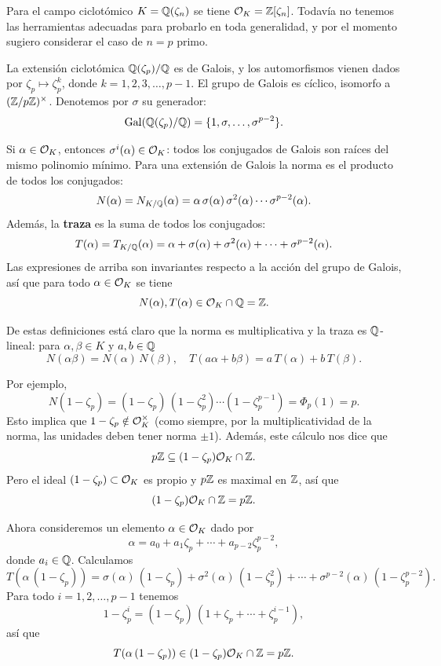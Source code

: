 \begin{ejemplo}
\label{ejemplo:O_K-para-Q(zeta_p)}
  Para el campo ciclotómico $K = \mathbb{Q} (\zeta_n)$ se tiene $\mathcal{O}_K = \mathbb{Z} [\zeta_n]$.
  Todavía no tenemos las herramientas adecuadas para probarlo en toda
  generalidad, y por el momento sugiero considerar el caso de $n = p$ primo.

  La extensión ciclotómica $\mathbb{Q} (\zeta_p)/\mathbb{Q}$ es de Galois, y los automorfismos
  vienen dados por $\zeta_p \mapsto \zeta_p^k$, donde $k = 1,2,3,\ldots,p-1$.
  El grupo de Galois es cíclico, isomorfo a $(\mathbb{Z}/p\mathbb{Z})^\times$. Denotemos por
  $\sigma$ su generador:
  $$\operatorname{Gal} (\mathbb{Q} (\zeta_p)/\mathbb{Q}) = \{ 1, \sigma, \ldots, \sigma^{p-2} \}.$$

  Si $\alpha \in \mathcal{O}_K$, entonces $\sigma^i (\alpha) \in \mathcal{O}_K$: todos los
  conjugados de Galois son raíces del mismo polinomio mínimo. Para una extensión
  de Galois la norma es el producto de todos los conjugados:
  \[ N (\alpha) = N_{K/\mathbb{Q}} (\alpha) =
     \alpha\,\sigma (\alpha)\,\sigma^2(\alpha)\cdots\sigma^{p-2}(\alpha). \]
  Además, la \textbf{traza} es la suma de todos los conjugados:
  \[ T (\alpha) = T_{K/\mathbb{Q}} (\alpha) =
     \alpha + \sigma (\alpha) + \sigma^2 (\alpha) + \cdots + \sigma^{p-2} (\alpha). \]
  Las expresiones de arriba son invariantes respecto a la acción del grupo de
  Galois, así que para todo $\alpha \in \mathcal{O}_K$ se tiene
  $$N (\alpha), T (\alpha) \in \mathcal{O}_K \cap \mathbb{Q} = \mathbb{Z}.$$

  De estas definiciones está claro que la norma es multiplicativa y la traza es
  $\mathbb{Q}$-lineal: para $\alpha,\beta \in K$ y $a,b \in \mathbb{Q}$
  \[ N (\alpha\beta) = N (\alpha) \, N (\beta), \quad
     T (a\alpha + b\beta) = a\,T (\alpha) + b\,T (\beta). \]

  Por ejemplo,
  \[ N (1 - \zeta_p) = (1 - \zeta_p)\,(1 - \zeta_p^2)\cdots (1 - \zeta_p^{p-1})
     = \Phi_p (1) = p. \]
  Esto implica que $1 - \zeta_p \notin \mathcal{O}_K^\times$ (como siempre, por la
  multiplicatividad de la norma, las unidades deben tener norma $\pm
  1$). Además, este cálculo nos dice que
  $$p\mathbb{Z} \subseteq (1 - \zeta_p) \mathcal{O}_K \cap \mathbb{Z}.$$
  Pero el ideal $(1 - \zeta_p) \subset \mathcal{O}_K$ es propio y $p\mathbb{Z}$ es maximal en
  $\mathbb{Z}$, así que
  $$(1-\zeta_p) \mathcal{O}_K \cap \mathbb{Z} = p\mathbb{Z}.$$

  Ahora consideremos un elemento $\alpha \in \mathcal{O}_K$ dado por
  $$\alpha = a_0 + a_1 \zeta_p + \cdots + a_{p-2} \zeta_p^{p-2},$$
  donde $a_i \in \mathbb{Q}$. Calculamos
  $$T (\alpha \, (1 - \zeta_p)) =
    \sigma (\alpha)\,(1 - \zeta_p) +
    \sigma^2 (\alpha)\,(1 - \zeta_p^2) +
    \cdots + 
    \sigma^{p-2} (\alpha)\,(1 - \zeta_p^{p-2}).$$
  Para todo $i = 1,2,\ldots,p-1$ tenemos
  $$1 - \zeta_p^i = (1 - \zeta_p)\,(1 + \zeta_p + \cdots + \zeta_p^{i-1}),$$
  así que
  $$T (\alpha \, (1 - \zeta_p)) \in (1 - \zeta_p) \mathcal{O}_K \cap \mathbb{Z} = p\mathbb{Z}.$$


\end{ejemplo}
